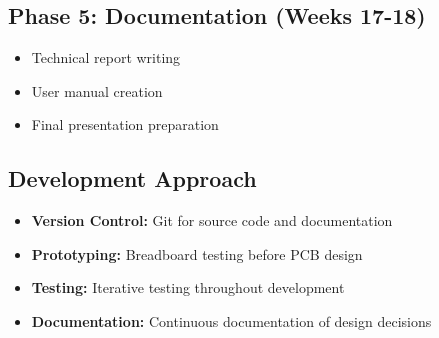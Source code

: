 \subsection*{Phase 5: Documentation (Weeks 17-18)}
\begin{itemize}
    \item Technical report writing
    \item User manual creation
    \item Final presentation preparation
\end{itemize}

\subsection*{Development Approach}
\begin{itemize}
    \item \textbf{Version Control:} Git for source code and documentation
    \item \textbf{Prototyping:} Breadboard testing before PCB design
    \item \textbf{Testing:} Iterative testing throughout development
    \item \textbf{Documentation:} Continuous documentation of design decisions
\end{itemize}
